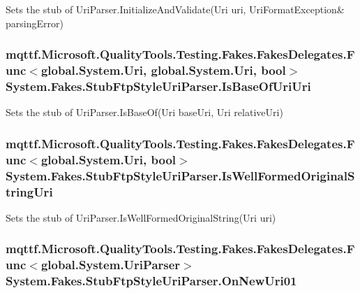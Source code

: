 Sets the stub of Uri\-Parser.\-Initialize\-And\-Validate(Uri uri, Uri\-Format\-Exception\& parsing\-Error)

\hypertarget{class_system_1_1_fakes_1_1_stub_ftp_style_uri_parser_a70e49e3e50d636c47fc2bd025b3be398}{
\subsubsection[{Is\-Base\-Of\-Uri\-Uri}]{\setlength{\rightskip}{0pt plus 5cm}mqttf.\-Microsoft.\-Quality\-Tools.\-Testing.\-Fakes.\-Fakes\-Delegates.\-Func$<$global.\-System.\-Uri, global.\-System.\-Uri, bool$>$ System.\-Fakes.\-Stub\-Ftp\-Style\-Uri\-Parser.\-Is\-Base\-Of\-Uri\-Uri}}\label{class_system_1_1_fakes_1_1_stub_ftp_style_uri_parser_a70e49e3e50d636c47fc2bd025b3be398}


Sets the stub of Uri\-Parser.\-Is\-Base\-Of(\-Uri base\-Uri, Uri relative\-Uri)

\hypertarget{class_system_1_1_fakes_1_1_stub_ftp_style_uri_parser_ac3a45693caf7522798f9eb104f401d21}{
\subsubsection[{Is\-Well\-Formed\-Original\-String\-Uri}]{\setlength{\rightskip}{0pt plus 5cm}mqttf.\-Microsoft.\-Quality\-Tools.\-Testing.\-Fakes.\-Fakes\-Delegates.\-Func$<$global.\-System.\-Uri, bool$>$ System.\-Fakes.\-Stub\-Ftp\-Style\-Uri\-Parser.\-Is\-Well\-Formed\-Original\-String\-Uri}}\label{class_system_1_1_fakes_1_1_stub_ftp_style_uri_parser_ac3a45693caf7522798f9eb104f401d21}


Sets the stub of Uri\-Parser.\-Is\-Well\-Formed\-Original\-String(\-Uri uri)

\hypertarget{class_system_1_1_fakes_1_1_stub_ftp_style_uri_parser_ace89e7ca6f8b534815b68dd110b172cb}{
\subsubsection[{On\-New\-Uri01}]{\setlength{\rightskip}{0pt plus 5cm}mqttf.\-Microsoft.\-Quality\-Tools.\-Testing.\-Fakes.\-Fakes\-Delegates.\-Func$<$global.\-System.\-Uri\-Parser$>$ System.\-Fakes.\-Stub\-Ftp\-Style\-Uri\-Parser.\-On\-New\-Uri01}}\label{class_system_1_1_fakes_1_1_stub_ftp_style_uri_parser_ace89e7ca6f8b534815b68dd110b172cb}


